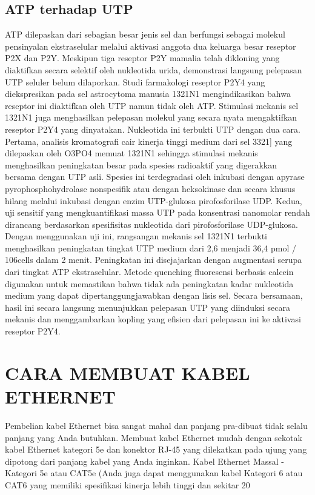 \subsection{ATP terhadap UTP}
ATP dilepaskan dari sebagian besar jenis sel dan berfungsi sebagai molekul pensinyalan ekstraselular melalui aktivasi anggota dua keluarga besar reseptor 
P2X dan P2Y. Meskipun tiga reseptor P2Y mamalia telah dikloning yang diaktifkan secara selektif oleh nukleotida urida, demonstrasi langsung pelepasan UTP 
seluler belum dilaporkan. Studi farmakologi reseptor P2Y4 yang diekspresikan pada sel astrocytoma manusia 1321N1 mengindikasikan bahwa reseptor ini diaktifkan 
oleh UTP namun tidak oleh ATP. Stimulasi mekanis sel 1321N1 juga menghasilkan pelepasan molekul yang secara nyata mengaktifkan reseptor P2Y4 yang dinyatakan. 
Nukleotida ini terbukti UTP dengan dua cara. Pertama, analisis kromatografi cair kinerja tinggi medium dari sel 3321] yang dilepaskan oleh O3PO4 memuat 1321N1 
sehingga stimulasi mekanis menghasilkan peningkatan besar pada spesies radioaktif yang digerakkan bersama dengan UTP asli. Spesies ini terdegradasi oleh 
inkubasi dengan apyrase pyrophosphohydrolase nonspesifik atau dengan heksokinase dan secara khusus hilang melalui inkubasi dengan enzim UTP-glukosa 
pirofosforilase UDP. Kedua, uji sensitif yang mengkuantifikasi massa UTP pada konsentrasi nanomolar rendah dirancang berdasarkan spesifisitas nukleotida dari 
pirofosforilase UDP-glukosa. Dengan menggunakan uji ini, rangsangan mekanis sel 1321N1 terbukti menghasilkan peningkatan tingkat UTP medium dari 2,6 menjadi 
36,4 pmol / 106cells dalam 2 menit. Peningkatan ini disejajarkan dengan augmentasi serupa dari tingkat ATP ekstraselular. Metode quenching fluoresensi 
berbasis calcein digunakan untuk memastikan bahwa tidak ada peningkatan kadar nukleotida medium yang dapat dipertanggungjawabkan dengan lisis sel. Secara 
bersamaan, hasil ini secara langsung menunjukkan pelepasan UTP yang diinduksi secara mekanis dan menggambarkan kopling yang efisien dari pelepasan ini ke 
aktivasi reseptor P2Y4.

\section{CARA MEMBUAT KABEL ETHERNET}

Pembelian kabel Ethernet bisa sangat mahal dan panjang pra-dibuat tidak selalu panjang yang Anda butuhkan. Membuat kabel Ethernet mudah dengan sekotak kabel Ethernet kategori 5e dan konektor RJ-45 yang dilekatkan pada ujung yang dipotong dari panjang kabel yang Anda inginkan.
Kabel Ethernet Massal - Kategori 5e atau CAT5e
(Anda juga dapat menggunakan kabel Kategori 6 atau CAT6 yang memiliki spesifikasi kinerja lebih tinggi dan sekitar 20%

